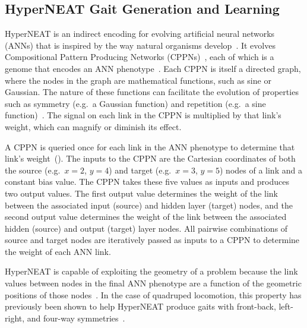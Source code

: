 \subsection{HyperNEAT Gait Generation and Learning}
    
HyperNEAT is an indirect encoding for evolving artificial neural
networks (ANNs) that is inspired by the way natural organisms
develop~\cite{stanley2009hypercube}. It evolves Compositional Pattern
Producing Networks (CPPNs)~\cite{stanley2007compositional}, each of
which is a genome that encodes an ANN
phenotype~\cite{stanley2009hypercube}. Each CPPN is itself a directed
graph, where the nodes in the graph are mathematical functions, such as sine or
Gaussian. The nature of these functions can facilitate the evolution
of properties such as symmetry (e.g.\ a Gaussian function) and repetition (e.g.\ a sine
function)~\cite{stanley2009hypercube, stanley2007compositional}. The
signal on each link in the CPPN is multiplied by that link's weight,
which can magnify or diminish its effect.
  
A CPPN is queried once for each link in the ANN phenotype to determine
that link's weight~(). The inputs to the CPPN are the Cartesian
coordinates of both the source (e.g.\ $x = 2$, $y = 4$) and target
(e.g.\ $x = 3$, $y = 5$) nodes of a link and a constant bias
value. The CPPN takes these five values as inputs and produces two output values. The first output value
determines the weight of the link between the associated input
(source) and hidden layer (target) nodes, and the second output value
determines the weight of the link between the associated hidden
(source) and output (target) layer nodes. All pairwise combinations of
source and target nodes are iteratively passed as inputs to a CPPN to
determine the weight of each ANN link.


HyperNEAT is capable of exploiting the geometry of a problem because
the link values between nodes in the final ANN phenotype are a
function of the geometric positions of those nodes~\cite{stanley2009hypercube, clune2009sensitivity,
  clune2011performance}. In the case of quadruped locomotion, this
property has previously been shown to help HyperNEAT produce gaits with front-back, left-right,
and four-way symmetries~\cite{clune2009evolving,
  clune2011performance}.
  
